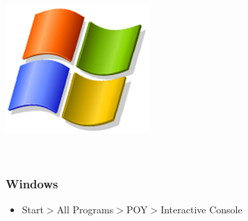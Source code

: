 {\begin{flushleft}
\begin{minipage}[c]{0.074\textwidth}
\includegraphics[width=\textwidth]{doc/figures/figlogowindows.jpg}
\end{minipage}
\,
\begin{minipage}[t]{0.88\textwidth}
\subsubsection*{Windows}
\end{minipage}
\begin{itemize}
\item{Start$>$All Programs$>$POY$>$Interactive Console}
\end{itemize}


\end{flushleft}}
